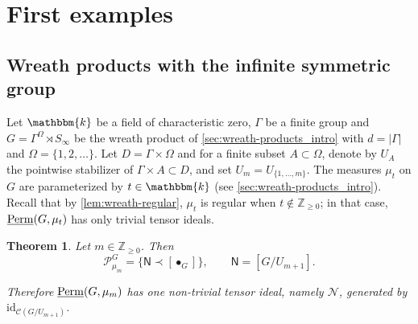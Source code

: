 \documentclass[11pt,a4paper]{amsart}
\theoremstyle{plain}%
\newtheorem{theorem}[lemma]{Theorem}
\theoremstyle{definition}
\theoremstyle{remark}
\newcommand{\Z}{{\mathbb Z}}
\newcommand{\Perm}{\underline{{\rm Perm}}}
\newcommand{\kk}{\mathbbm{k}}
\newcommand{\cC}{\mathcal{C}}
\begin{document}



\section{First examples}




\subsection{Wreath products with the infinite symmetric group}\label{subsec:wreath-products-iedals}

Let $\kk$ be a field of
characteristic zero, $\Gamma$ be a finite group and $G=\Gamma^{\Omega}\rtimes S_\infty$ be the wreath product of \cref{sec:wreath-products_intro} with $d=|\Gamma|$ and $\Omega=\{1,2,\ldots\}$. Let $D=\Gamma\times \Omega$ and for a finite subset $A\subset \Omega$, denote by $U_A$ the pointwise stabilizer
of $\Gamma\times A\subset D$, and set $U_{m}=U_{\{1, \ldots, m\}}$. The measures $\mu_t$ on $G$ are parameterized by $t\in \kk$ (see \cref{sec:wreath-products_intro}). Recall that by \cref{lem:wreath-regular}, $\mu_t$ is regular when $t\notin \Z_{\geq 0}$; in that case, $\Perm(G, \mu_t)$ has only trivial tensor ideals.

\begin{theorem}\label{thm:wp-tensor-ideals}
Let $m\in\mathbb Z_{\geq0}$. Then
\[
  \mathcal P^G_{\mu_m}
  =\{\mathsf N\prec[\bullet_G]\},
  \qquad \mathsf N=[G/U_{m+1}].
\]

Therefore $\Perm(G,\mu_m)$ has one non-trivial
tensor ideal, namely $\mathcal N$, generated by
  $\mathrm{id}_{\cC(G/U_{m+1})}$.
\end{theorem}
\end{document}
